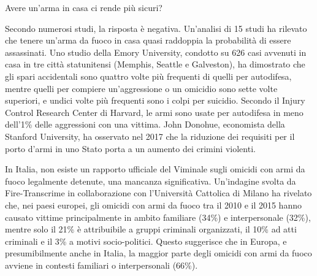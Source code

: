 \documentclass[12pt]{book} %
\begin{document}
\bigskip
\begin{mdframed}[linewidth=1pt]
Avere un'arma in casa ci rende più sicuri?

Secondo numerosi studi, la risposta è negativa. Un'analisi di 15 studi ha rilevato che tenere un'arma da fuoco in casa quasi raddoppia la probabilità di essere assassinati. Uno studio della Emory University, condotto su 626 casi avvenuti in casa in tre città statunitensi (Memphis, Seattle e Galveston), ha dimostrato che gli spari accidentali sono quattro volte più frequenti di quelli per autodifesa, mentre quelli per compiere un'aggressione o un omicidio sono sette volte superiori, e undici volte più frequenti sono i colpi per suicidio. Secondo il Injury Control Research Center di Harvard, le armi sono usate per autodifesa in meno dell'1\% delle aggressioni con una vittima. John Donohue, economista della Stanford University, ha osservato nel 2017 che la riduzione dei requisiti per il porto d'armi in uno Stato porta a un aumento dei crimini violenti.

In Italia, non esiste un rapporto ufficiale del Viminale sugli omicidi con armi da fuoco legalmente detenute, una mancanza significativa. Un’indagine svolta da Fire-Transcrime in collaborazione con l'Università Cattolica di Milano ha rivelato che, nei paesi europei, gli omicidi con armi da fuoco tra il 2010 e il 2015 hanno causato vittime principalmente in ambito familiare (34\%) e interpersonale (32\%), mentre solo il 21\% è attribuibile a gruppi criminali organizzati, il 10\% ad atti criminali e il 3\% a motivi socio-politici. Questo suggerisce che in Europa, e presumibilmente anche in Italia, la maggior parte degli omicidi con armi da fuoco avviene in contesti familiari o interpersonali (66\%).


\end{mdframed}
\end{document}
